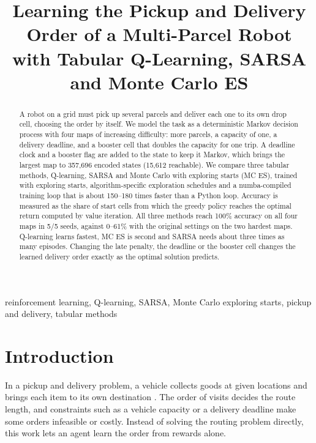 \documentclass[conference]{IEEEtran}
\begin{document}
\title{Learning the Pickup and Delivery Order of a Multi-Parcel Robot with Tabular Q-Learning, SARSA and Monte Carlo ES}

\author{
}

\maketitle

\begin{abstract}
A robot on a grid must pick up several parcels and deliver each one to its own drop cell, choosing the order by itself. We model the task as a deterministic Markov decision process with four maps of increasing difficulty: more parcels, a capacity of one, a delivery deadline, and a booster cell that doubles the capacity for one trip. A deadline clock and a booster flag are added to the state to keep it Markov, which brings the largest map to 357,696 encoded states (15,612 reachable). We compare three tabular methods, Q-learning, SARSA and Monte Carlo with exploring starts (MC ES), trained with exploring starts, algorithm-specific exploration schedules and a numba-compiled training loop that is about 150--180 times faster than a Python loop. Accuracy is measured as the share of start cells from which the greedy policy reaches the optimal return computed by value iteration. All three methods reach 100\% accuracy on all four maps in 5/5 seeds, against 0--61\% with the original settings on the two hardest maps. Q-learning learns fastest, MC ES is second and SARSA needs about three times as many episodes. Changing the late penalty, the deadline or the booster cell changes the learned delivery order exactly as the optimal solution predicts.
\end{abstract}

\begin{IEEEkeywords}
reinforcement learning, Q-learning, SARSA, Monte Carlo exploring starts, pickup and delivery, tabular methods
\end{IEEEkeywords}

\section{Introduction}
In a pickup and delivery problem, a vehicle collects goods at given locations and brings each item to its own destination \cite{b9}. The order of visits decides the route length, and constraints such as a vehicle capacity or a delivery deadline make some orders infeasible or costly. Instead of solving the routing problem directly, this work lets an agent learn the order from rewards alone.
\end{document}
